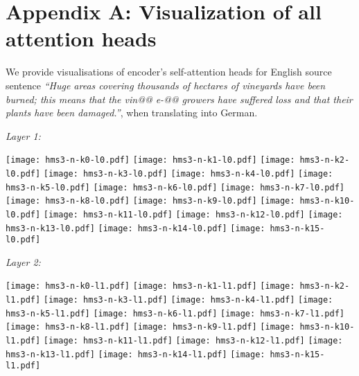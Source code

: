 \documentclass[11pt,a4paper]{article}
\begin{document}
\section*{Appendix A: Visualization of all attention heads}
We provide visualisations of encoder's self-attention heads for English source sentence
\emph{``Huge areas covering thousands of hectares of vineyards have been burned; this means that the vin@@ e-@@ growers have suffered loss and that their plants have been damaged.''},
when translating into German.
\begin{flushleft}
\bigskip
\emph{Layer 1:}

\texttt{[image: hms3-n-k0-l0.pdf]}
\texttt{[image: hms3-n-k1-l0.pdf]}
\texttt{[image: hms3-n-k2-l0.pdf]}
\texttt{[image: hms3-n-k3-l0.pdf]}
\texttt{[image: hms3-n-k4-l0.pdf]}
\texttt{[image: hms3-n-k5-l0.pdf]}
\texttt{[image: hms3-n-k6-l0.pdf]}
\texttt{[image: hms3-n-k7-l0.pdf]}
\texttt{[image: hms3-n-k8-l0.pdf]}
\texttt{[image: hms3-n-k9-l0.pdf]}
\texttt{[image: hms3-n-k10-l0.pdf]}
\texttt{[image: hms3-n-k11-l0.pdf]}
\texttt{[image: hms3-n-k12-l0.pdf]}
\texttt{[image: hms3-n-k13-l0.pdf]}
\texttt{[image: hms3-n-k14-l0.pdf]}
\texttt{[image: hms3-n-k15-l0.pdf]}

\bigskip
\emph{Layer 2:}

\texttt{[image: hms3-n-k0-l1.pdf]}
\texttt{[image: hms3-n-k1-l1.pdf]}
\texttt{[image: hms3-n-k2-l1.pdf]}
\texttt{[image: hms3-n-k3-l1.pdf]}
\texttt{[image: hms3-n-k4-l1.pdf]}
\texttt{[image: hms3-n-k5-l1.pdf]}
\texttt{[image: hms3-n-k6-l1.pdf]}
\texttt{[image: hms3-n-k7-l1.pdf]}
\texttt{[image: hms3-n-k8-l1.pdf]}
\texttt{[image: hms3-n-k9-l1.pdf]}
\texttt{[image: hms3-n-k10-l1.pdf]}
\texttt{[image: hms3-n-k11-l1.pdf]}
\texttt{[image: hms3-n-k12-l1.pdf]}
\texttt{[image: hms3-n-k13-l1.pdf]}
\texttt{[image: hms3-n-k14-l1.pdf]}
\texttt{[image: hms3-n-k15-l1.pdf]}


\end{flushleft}
\end{document}
